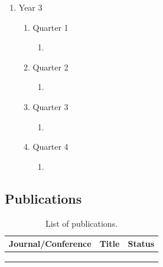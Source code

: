 \documentclass[11pt,a4paper]{article}
\begin{document}
\begin{enumerate}
\begin{enumerate}
    \item Quarter 3
    
    \begin{enumerate}
      \item 
    \end{enumerate}
    
    \item Quarter 4
    
    \begin{enumerate}
      \item 
    \end{enumerate}

  \end{enumerate}

\item Year 3

  \begin{enumerate}

    \item Quarter 1
    
    \begin{enumerate}
      \item 
    \end{enumerate}
    
    \item Quarter 2
    
    \begin{enumerate}
      \item 
    \end{enumerate}
    \item Quarter 3
    
    \begin{enumerate}
      \item 
    \end{enumerate}
    
    \item Quarter 4
    
    \begin{enumerate}
      \item 
    \end{enumerate}

  \end{enumerate}

\end{enumerate}

\subsection{Publications}
    \begin{table}[h]
        \centering
        \begin{tabular}{|p{6cm}|p{7cm}|p{2cm}|}
        \hline
            Journal/Conference & Title & Status\\
            \hline
             &  &  \\
            \hline
             &  &  \\
            \hline
             &  &  \\
            \hline
        \end{tabular}
        \caption{List of publications.}
        \label{tab:publications}
    \end{table}
\end{document}
